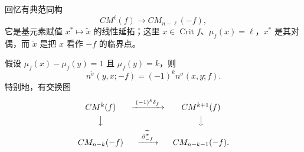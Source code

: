 回忆有典范同构
\[
 CM^\ell(f)\longrightarrow CM_{n-\ell}(-f),
\]
它是基元素赋值 $x^*\mapsto\widetilde x$ 的线性延拓；这里
$x\in\operatorname{Crit}f$、$\mu_f(x)=\ell$，$x^*$ 是其对偶，而
$\widetilde x$ 是把 $x$ 看作 $-f$ 的临界点。

\begin{proposition}
\label{prop:time-reversal-morse-sign}
假设 $\mu_f(x)-\mu_f(y)=1$ 且 $\mu_f(y)=k$，则
\[
 n^{\widetilde\sigma}(y,x;-f)=(-1)^k n^\sigma(x,y;f).
\]
特别地，有交换图
\begin{equation}
\begin{array}{ccc}
 CM^k(f)&\xrightarrow{\;(-1)^k\delta_f\;}&CM^{k+1}(f)\\[4pt]
 \big\downarrow&&\big\downarrow\\[4pt]
 CM_{n-k}(-f)&\xrightarrow{\;\partial_{-f}^{\widetilde\sigma}\;}&
 CM_{n-k-1}(-f).
\end{array}
\label{eq:19-time-reversal-commutative-diagram}
\end{equation}
\end{proposition}

